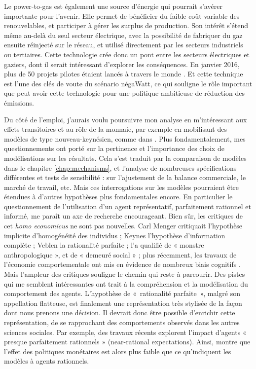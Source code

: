 Le power-to-gas est également une source d’énergie qui pourrait s’avérer importante pour l’avenir. Elle permet de bénéficier du faible coût variable des renouvelables, et participer à gérer les surplus de production. Son intérêt s’étend même au-delà du seul secteur électrique, avec la possibilité de fabriquer du gaz ensuite réinjecté sur le réseau, et utilisé directement par les secteurs industriels ou tertiaires. Cette technologie crée donc un pont entre les secteurs électriques et gaziers, dont il serait intéressant d’explorer les conséquences. En janvier 2016, plus de 50 projets pilotes étaient lancés à travers le monde \citep{EneaConsulting2016}. Et cette technique est l’une des clés de voute du scénario négaWatt, ce qui souligne le rôle important que peut avoir cette technologie pour une politique ambitieuse de réduction des émissions.


Du côté de l’emploi, j’aurais voulu poursuivre mon analyse en m’intéressant aux effets transitoires et au rôle de la monnaie, par exemple en mobilisant des modèles de type nouveau-keynésien, comme dans \citet{Blanchard2007}. 
Plus fondamentalement, mes questionnements ont porté sur la pertinence et l’importance des choix de modélisations sur les résultats. Cela s’est traduit par la comparaison de modèles dans le chapitre \ref{chap:mechanisms}, et l’analyse de nombreuses spécifications différentes et tests de sensibilité : sur l’ajustement de la balance commerciale, le marché de travail, etc. 
Mais ces interrogations sur les modèles pourraient être étendues à d'autres hypothèses plus fondamentales encore. En particulier le questionnement de l’utilisation d’un agent représentatif, parfaitement rationnel et informé, me paraît un axe de recherche encourageant. Bien sûr, les critiques de cet \textit{homo economicus} ne sont pas nouvelles. Carl Menger critiquait l’hypothèse implicite d’homogénéité des individus ; Keynes l’hypothèse d’information complète ; Veblen la rationalité parfaite ; \citet{Bourdieu1977} l’a qualifié de « monstre anthropologique », et \citet{Sen2012} de « demeuré social » ; plus récemment, les travaux de l’économie comportementale ont mis en évidence de nombreux biais cognitifs \citep{Thaler2009,Kahneman2011}.
Mais l’ampleur des critiques souligne le chemin qui reste à parcourir. Des pistes qui me semblent intéressantes ont trait à la compréhension et la modélisation du comportement des agents. L'hypothèse de «~rationalité parfaite~», malgré son appellation flatteuse, est finalement une représentation très stylisée de la façon dont nous prenons une décision. Il devrait donc être possible d'enrichir cette représentation, de se rapprochant des comportements observés dans les autres sciences sociales. Par exemple, des travaux récents explorent l’impact d’agents « presque parfaitement rationnels » (near-rational expectations). Ainsi, \citet{Farhi2016} montre que l’effet des politiques monétaires est alors plus faible que ce qu’indiquent les modèles à agents rationnels.

